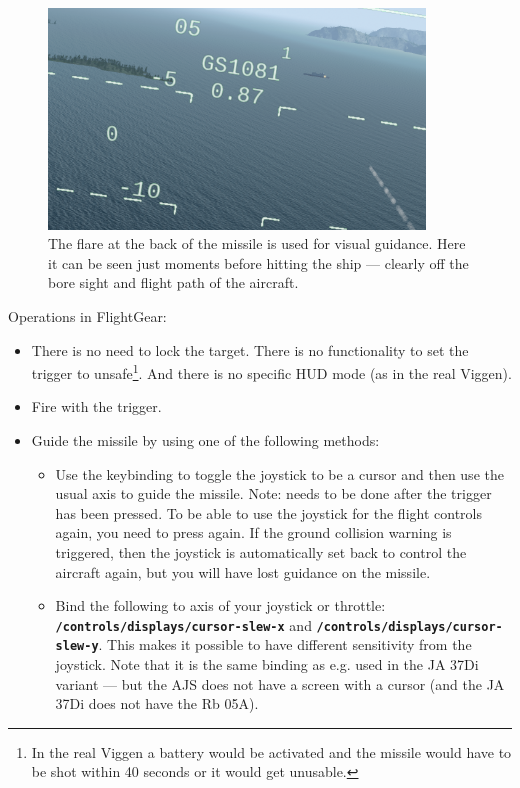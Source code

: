 {\begin{figure}[h]
\centering
 \includegraphics[width=10cm]{images/rb_05a_before_impact_ship.png}
 \caption[Flare at back of missile for guidance]{The flare at the back of the missile is used for visual guidance. Here it can be seen just moments before hitting the ship --- clearly off the bore sight and flight path of the aircraft.}
\end{figure}

Operations in FlightGear:
\begin{itemize}
 \item There is no need to lock the target. There is no functionality to set the trigger to unsafe\footnote{In the real Viggen a battery would be activated and the missile would have to be shot within 40 seconds or it would get unusable.}. And there is no specific HUD mode (as in the real Viggen).

 \item Fire with the trigger.
 \item Guide the missile by using one of the following methods:
 \begin{itemize}
  \item Use the keybinding  to toggle the joystick to be a cursor and then use the usual axis to guide the missile. Note: needs to be done after the trigger has been pressed. To be able to use the joystick for the flight controls again, you need to press  again. If the ground collision warning is triggered, then the joystick is automatically set back to control the aircraft again, but you will have lost guidance on the missile.
  \item Bind the following to axis of your joystick or throttle: \textbf{\texttt{/controls/displays/cursor-slew-x}} and \textbf{\texttt{/controls/displays/cursor-slew-y}}. This makes it possible to have different sensitivity from the joystick. Note that it is the same binding as e.g. used in the JA 37Di variant --- but the AJS does not have a screen with a cursor (and the JA 37Di does not have the Rb 05A).
 \end{itemize}


\end{itemize}}
